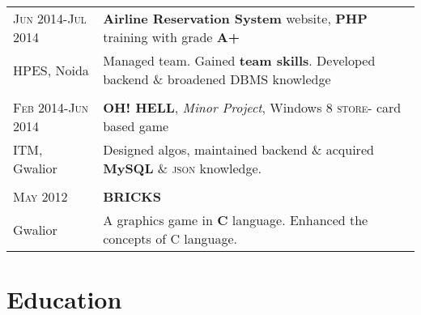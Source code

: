 \documentclass[a4paper,10pt]{article} %
\begin{document}
\begin{tabular}{l|p{11cm}}

\textsc{Jun 2014-Jul 2014} & \textbf{Airline Reservation System} website, \textbf{PHP} training with grade \textbf{A+} \emph{}\\
HPES, Noida & \footnotesize{Managed team. Gained \textbf{team skills}. Developed backend \& broadened DBMS knowledge}\\
\multicolumn{2}{c}{} \\


\textsc{Feb 2014-Jun 2014} & \textbf{OH! HELL}, \emph{Minor Project}, Windows 8 \textsc{store}- card based game \emph{}\\
ITM, Gwalior & \footnotesize{Designed algos, maintained backend \& acquired \textbf{MySQL} \& \textsc{json} knowledge.}\\
\multicolumn{2}{c}{} \\


\textsc{May 2012} & \textbf{BRICKS} \emph{}\\
Gwalior & \footnotesize{A graphics game in \textbf{C} language. Enhanced the concepts of C language.}
\end{tabular}


\section{Education}
\end{document}
